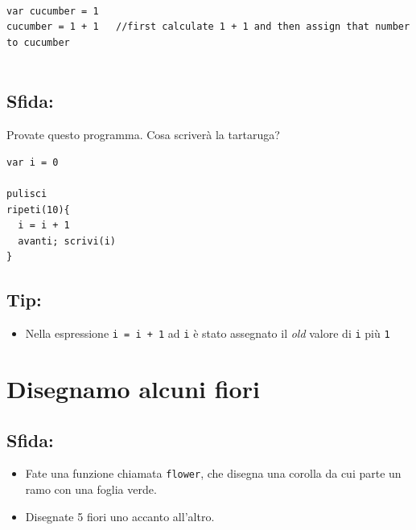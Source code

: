 \begin{lstlisting}[numbers=none]

var cucumber = 1
cucumber = 1 + 1   //first calculate 1 + 1 and then assign that number to cucumber     
        
\end{lstlisting}
        
\section*{\color{BrickRed}Sfida:}
Provate questo programma. Cosa scriverà la tartaruga?

\begin{lstlisting}[basicstyle={\ttfamily\fontsize{16}{19}\selectfont},numbers=none]
var i = 0

pulisci
ripeti(10){
  i = i + 1
  avanti; scrivi(i)
}
\end{lstlisting}
        
\section*{\color{OliveGreen}Tip:}


\begin{itemize}

\item {Nella espressione \lstinline{i = i + 1} ad \lstinline{i} è stato assegnato il {\it old} valore di \lstinline{i} più \lstinline{1}}

\end{itemize}


\chapter{Disegnamo alcuni fiori}\section*{\color{BrickRed}Sfida:}


\begin{itemize}

\item {Fate una funzione chiamata \lstinline{flower}, che disegna una corolla da cui parte un ramo con una foglia verde.}
\item {Disegnate 5 fiori uno accanto all'altro.}

\end{itemize}



